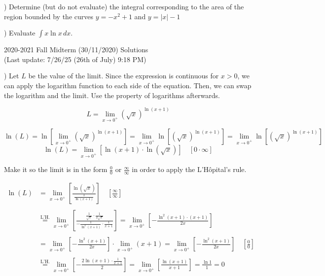 \documentclass{article}
\begin{document}
) Determine (but do not evaluate) the integral corresponding to the area of the region bounded by the curves $y = -x^2 + 1$ and $y = |x|- 1$

\hfill

) Evaluate $\displaystyle \int x\ln x \, dx$.

\hfill

\newpage

\begin{center}
2020-2021 Fall Midterm (30/11/2020) Solutions\\
(Last update: 7/26/25 (26th of July) 9:18 PM)
\end{center}

) Let $L$ be the value of the limit. Since the expression is continuous for $x>0$, we can apply the logarithm function to each side of the equation. Then, we can swap the logarithm and the limit. Use the property of logarithms afterwards.

\begin{equation*}L=\lim_{x\to0^+} \left(\sqrt x\right)^{\ln\left(x+1\right)}\end{equation*}

\begin{equation*}\ln(L)=\ln\left[\lim_{x\to0^+} \left(\sqrt x\right)^{\ln\left(x+1\right)}\right] = \lim_{x\to0^+} \ln\left[\left(\sqrt x\right)^{\ln\left(x+1\right)}\right] = \lim_{x\to0^+} \ln\left[\left(\sqrt x\right)^{\ln\left(x+1\right)}\right] \end{equation*}
\begin{equation*}\ln\left(L\right) = \lim_{x\to0^+} \left[\ln\left(x+1\right)\cdot\ln\left(\sqrt x\right)\right] \quad\left[0\cdot\infty\right]\end{equation*}

\hfill

\noindent Make it so the limit is in the form $\displaystyle \frac00$ or $\displaystyle \frac\infty\infty$ in order to apply the L'Hôpital's rule.

\begin{align*}\ln\left(L\right) &= \lim_{x\to0^+} \left[\frac{\ln\left(\sqrt x\right)}{\frac1{\ln\left(x+1\right)}}\right] \quad\left[\frac\infty\infty\right]\\\\&\overset{\text{L'H.}}{=}\lim_{x\to0^+} \left[\frac{\frac1{\sqrt x}\cdot\frac1{2\sqrt x}}{-\frac1{\ln^2\left(x+1\right)}\cdot \frac1{x+1}}\right] = \lim_{x\to0^+} \left[-\frac{\ln^2(x+1)\cdot(x+1)}{2x}\right]\\\\&=\lim_{x\to0^+} \left[-\frac{\ln^2(x+1)}{2x}\right] \cdot\lim_{x\to0^+} \left(x+1\right)=\lim_{x\to0^+} \left[-\frac{\ln^2(x+1)}{2x}\right]\quad\left[\frac00\right]\\\\&\overset{\text{L'H.}}{=}\lim_{x\to0^+} \left[-\frac{2\ln(x+1) \cdot\frac1{x+1}}2\right]=\lim_{x\to0^+} \left[\frac{\ln(x+1)}{x+1}\right] = \frac{\ln1}{1}=0\end{align*}
\end{document}
